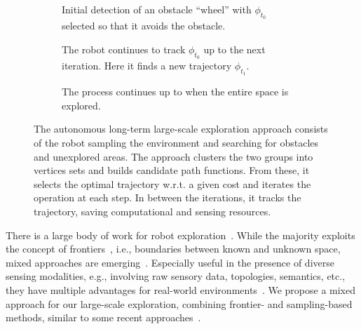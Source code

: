 \documentclass[lettersize,journal]{IEEEtran}
\theoremstyle{definition}
\begin{document}
\begin{figure*}
  \begin{subfigure}[m]{0.33\textwidth}
    \centering
    
    \caption{Initial detection of an obstacle ``wheel'' with $\phi_{t_0}$ selected so that it avoids the obstacle.}
    \label{fig:3-1}
  \end{subfigure}
  \hfill
  \begin{subfigure}[m]{0.32\textwidth}
    \centering
    \hspace*{-.15cm}
    
    \caption{The robot continues to track $\phi_{t_0}$ up to the next iteration. Here it finds a new trajectory $\phi_{t_1}$.}
    \label{fig:3-2}
  \end{subfigure}
  \begin{subfigure}[m]{0.33\textwidth}
    \centering
    \hspace*{.05cm}
    
    \caption{The process continues up to when the entire space is explored.}
    \label{fig:3-3}
  \end{subfigure}
  \caption{The autonomous long-term large-scale exploration %
  approach consists of the robot sampling the environment and searching for obstacles and unexplored areas. The %
  approach clusters the two groups into vertices sets and builds candidate path functions. From these, it selects the optimal trajectory w.r.t. a given cost and iterates the operation at each step. In between the iterations, it tracks the trajectory, saving computational and sensing resources.}
  \label{fig:3}
\end{figure*}

There is a large body of work for robot exploration~\cite{lavalle2006planning,yamauchi1997frontier,placed2022survey,dang2019graph,julia2012comparison}. 
While the majority exploits the concept of frontiers~\cite{wenchuan2019sampling}, i.e., boundaries between known and unknown space, mixed approaches are emerging~\cite{dai2020fast,schmid2020efficient,placed2022survey}. 
Especially useful in the presence of diverse sensing modalities, e.g., involving raw sensory data, topologies, semantics, etc., they have multiple %
advantages for real-world environments~\cite{placed2022survey,batinovic2021multi}. 
%
We propose a %
mixed approach for our large-scale exploration, %
combining frontier- and sampling-based methods, similar to some recent approaches~\cite{dai2020fast,wenchuan2019sampling,shrestha2019learned}. %
\end{document}
